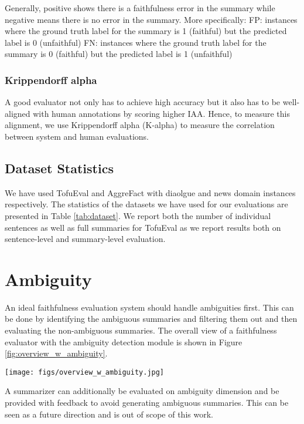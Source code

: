 Generally, positive shows there is a faithfulness error in the summary while negative means there is no error in the summary.   More specifically:
FP: instances where the ground truth label for the summary is 1 (faithful) but the predicted label is 0 (unfaithful)
FN: instances where the ground truth label for the summary is 0 (faithful) but the predicted label is 1 (unfaithful)


\subsubsection{Krippendorff alpha}
A good evaluator not only has to achieve high accuracy but it also has to be well-aligned with human annotations by scoring higher IAA. Hence, to measure this alignment, we use Krippendorff alpha (K-alpha) \cite{krippendorff2011computing} to measure the correlation between system and human evaluations. 

\subsection{Dataset Statistics}\label{app:data-stats}
We have used TofuEval \cite{tang2024tofueval} and AggreFact \cite{tang-etal-2023-understanding} with diaolgue and news domain instances respectively.
The statistics of the datasets we have used for our evaluations are presented in Table \ref{tab:dataset}. We report both the number of individual sentences as well as full summaries for TofuEval as we report results both on sentence-level and summary-level evaluation.


\section{Ambiguity}\label{app:ambiguity}
An ideal faithfulness evaluation system should handle ambiguities first. This can be done by identifying the ambiguous summaries and filtering them out and then evaluating the non-ambiguous summaries. 
The overall view of a faithfulness evaluator with the ambiguity detection module is shown in Figure \ref{fig:overview_w_ambiguity}.
\begin{figure*}
    \centering
    \texttt{[image: figs/overview\_w\_ambiguity.jpg]}
    \caption{Faithfulness evaluator with ambiguity detection module.}
    \label{fig:overview_w_ambiguity}
\end{figure*}

A summarizer can additionally be evaluated on ambiguity dimension and be provided with feedback to avoid generating ambiguous summaries. This can be seen as a future direction and is out of scope of this work.

